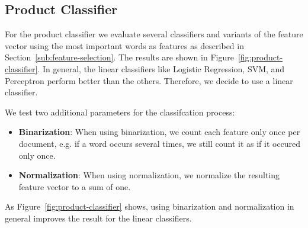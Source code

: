 \subsection{Product Classifier}
For the product classifier we evaluate several classifiers and variants of the feature vector using the most important words as features as described in Section~\ref{sub:feature-selection}.
The results are shown in Figure~\ref{fig:product-classifier}.
In general, the linear classifiers like Logistic Regression, SVM, and Perceptron perform better than the others.
Therefore, we decide to use a linear classifier.

We test two additional parameters for the classifcation process:
\begin{itemize}
	\item
		\textbf{Binarization}:
			When using binarization, we count each feature only once per document, e.g. if a word occurs several times, we still count it as if it occured only once.
	\item
		\textbf{Normalization}:
			When using normalization, we normalize the resulting feature vector to a sum of one.
\end{itemize}
As Figure~\ref{fig:product-classifier} shows, using binarization and normalization in general improves the result for the linear classifiers.

